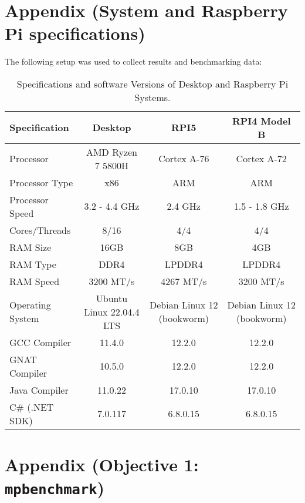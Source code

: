 \section{Appendix (System and Raspberry Pi specifications)}
\label{sec:sysetm_specs}

The following setup was used to collect results and benchmarking data:

\begin{table}[htbp]
	\centering
	\begin{tabular}{@{}lccc@{}}
		\toprule
		\textbf{Specification} & \textbf{Desktop} & \textbf{RPI5} & \textbf{RPI4 Model B} \\ 
		\midrule
		Processor             & AMD Ryzen 7 5800H & Cortex A-76 & Cortex A-72 \\
		Processor Type          & x86                      & ARM            & ARM \\
		Processor Speed        & 3.2 - 4.4 GHz       & 2.4 GHz       & 1.5 - 1.8 GHz\\
		Cores/Threads            & 8/16                    & 4/4                & 4/4 \\
		RAM Size                   & 16GB                  & 8GB              & 4GB \\
		RAM Type                  & DDR4                  & LPDDR4       & LPDDR4 \\
		RAM Speed                & 3200 MT/s           & 4267 MT/s    &3200 MT/s \\
		Operating System      & Ubuntu Linux 22.04.4 LTS & Debian Linux 12 (bookworm) &  Debian Linux 12 (bookworm)\\
		GCC Compiler           & 11.4.0               & 12.2.0        &  12.2.0\\
		GNAT Compiler         & 10.5.0               & 12.2.0        &  12.2.0\\
		Java Compiler            & 11.0.22            & 17.0.10      &  17.0.10\\
		C\# (.NET SDK)         & 7.0.117             & 6.8.0.15     &  6.8.0.15\\
		\bottomrule
	\end{tabular}
	\caption{Specifications and software Versions of Desktop and Raspberry Pi Systems\cite{rasp_pi5_pi4_comparision}\cite{desktop_specs}\cite{rpi_specs}.}
	\label{tab:spec_comparisons}
\end{table}

\newpage
\section{Appendix (Objective 1: \texttt{mpbenchmark})}
\label{sec:app_obj1}

